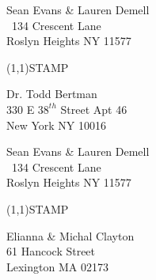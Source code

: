 \documentclass[12pt]{article}
\begin{document}
\begin{minipage}{.5\linewidth} \noindent
Sean Evans \& Lauren Demell\\\ 
134 Crescent Lane\\ 
Roslyn Heights NY 11577
\end{minipage}
\begin{minipage}{.5\linewidth \hspace{-.2in} \vspace{-.3in}}
\begin{flushright}
\framebox(1,1){STAMP}
\end{flushright}
\end{minipage}

\begin{center} \begin{Huge} \vspace*{\fill}
Dr. Todd Bertman\\
330 E $38^{th}$ Street Apt 46\\
New York NY 10016\\
\vspace{\fill} \end{Huge} \end{center}

\clearpage

\begin{minipage}{.5\linewidth} \noindent
Sean Evans \& Lauren Demell\\\ 
134 Crescent Lane\\ 
Roslyn Heights NY 11577
\end{minipage}
\begin{minipage}{.5\linewidth \hspace{-.2in} \vspace{-.3in}}
\begin{flushright}
\framebox(1,1){STAMP}
\end{flushright}
\end{minipage}

\begin{center} \begin{Huge} \vspace*{\fill}
Elianna \& Michal Clayton\\
61 Hancock Street\\
Lexington MA 02173\\
\vspace{\fill} \end{Huge} \end{center}

\clearpage
\end{document}
